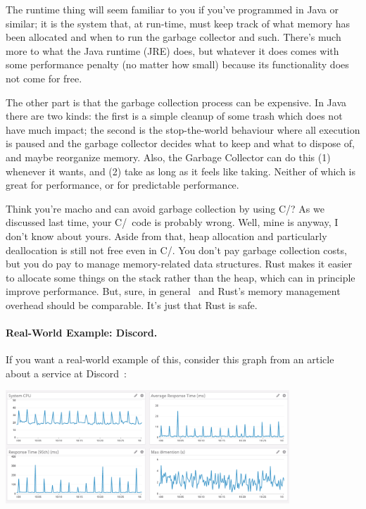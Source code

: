 The runtime thing will seem familiar to you if you've programmed in Java or similar; it is the system that, at run-time, must keep track of what memory has been allocated and when to run the garbage collector and such. There's much more to what the Java runtime (JRE) does, but whatever it does comes with some performance penalty (no matter how small) because its functionality does not come for free. 

The other part is that the garbage collection process can be expensive. In Java there are two kinds: the first is a simple cleanup of some trash which does not have much impact; the second is the stop-the-world behaviour where all execution is paused and the garbage collector decides what to keep and what to dispose of, and maybe reorganize memory.  Also, the Garbage Collector can do this (1) whenever it wants, and (2) take as long as it feels like taking. Neither of which is great for performance, or for predictable performance.

Think you're macho and can avoid garbage collection by using C/\CPP? As we discussed last time, your C/\CPP~code is probably wrong. Well, mine is anyway, I don't know about yours. Aside from that, heap allocation and particularly deallocation is still not free even in C/\CPP. You don't pay garbage collection costs, but you do pay to manage memory-related data structures. Rust makes it easier to allocate some things on the stack rather than the heap, which can in principle improve performance. But, sure, in general \CPP~and Rust's memory management overhead should be comparable. It's just that Rust is safe.

\paragraph{Real-World Example: Discord.} If you want a real-world example of this, consider this graph from an article about a service at Discord~\cite{discord}:

\begin{center}
\includegraphics[width=0.8\textwidth]{images/golang-gc.png}
\end{center}

